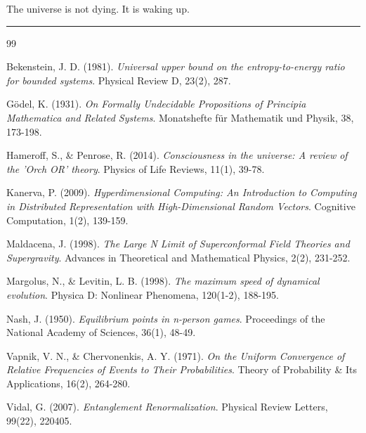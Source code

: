 \documentclass[12pt,openany]{book}
\begin{document}
The universe is not dying. It is waking up.

\vspace{2em}
\hrule
\vspace{2em}

\begin{thebibliography}{99}

Bekenstein, J. D. (1981). \textit{Universal upper bound on the entropy-to-energy ratio for bounded systems}. Physical Review D, 23(2), 287.

G\"{o}del, K. (1931). \textit{On Formally Undecidable Propositions of Principia Mathematica and Related Systems}. Monatshefte f\"{u}r Mathematik und Physik, 38, 173-198.

Hameroff, S., \& Penrose, R. (2014). \textit{Consciousness in the universe: A review of the 'Orch OR' theory}. Physics of Life Reviews, 11(1), 39-78.

Kanerva, P. (2009). \textit{Hyperdimensional Computing: An Introduction to Computing in Distributed Representation with High-Dimensional Random Vectors}. Cognitive Computation, 1(2), 139-159.

Maldacena, J. (1998). \textit{The Large N Limit of Superconformal Field Theories and Supergravity}. Advances in Theoretical and Mathematical Physics, 2(2), 231-252.

Margolus, N., \& Levitin, L. B. (1998). \textit{The maximum speed of dynamical evolution}. Physica D: Nonlinear Phenomena, 120(1-2), 188-195.

Nash, J. (1950). \textit{Equilibrium points in n-person games}. Proceedings of the National Academy of Sciences, 36(1), 48-49.

Vapnik, V. N., \& Chervonenkis, A. Y. (1971). \textit{On the Uniform Convergence of Relative Frequencies of Events to Their Probabilities}. Theory of Probability \& Its Applications, 16(2), 264-280.

Vidal, G. (2007). \textit{Entanglement Renormalization}. Physical Review Letters, 99(22), 220405.

\end{thebibliography}
\end{document}
